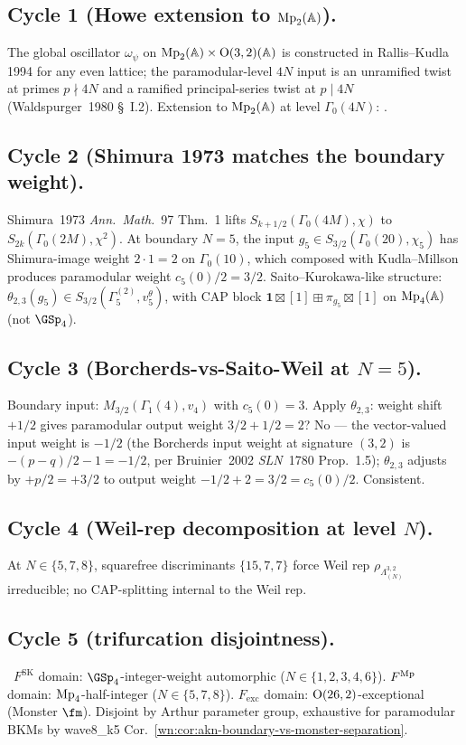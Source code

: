 \subsection{Cycle 1 (Howe extension to $\mathrm{Mp}_2(\mathbb{A})$).} The global
oscillator $\omega_\psi$ on $\mathrm{Mp}_2(\mathbb{A}) \times \mathrm{O}(3,2)(\mathbb{A})$ is
constructed in Rallis--Kudla 1994 for any even lattice; the
paramodular-level $4N$ input is an unramified twist at primes
$p \nmid 4N$ and a ramified principal-series twist at $p \mid 4N$
(Waldspurger~1980 \S~I.2).  Extension to $\mathrm{Mp}_2(\mathbb{A})$ at level $\Gamma_0(4N)$:
\ClaimStatusTheorem.

\subsection{Cycle 2 (Shimura 1973 matches the boundary weight).}
Shimura~1973 \emph{Ann.\ Math.}~97 Thm.~1 lifts
$S_{k + 1/2}(\Gamma_0(4M), \chi)$ to $S_{2k}(\Gamma_0(2M), \chi^2)$.
At boundary $N = 5$, the input $g_5 \in S_{3/2}(\Gamma_0(20), \chi_5)$
has Shimura-image weight $2 \cdot 1 = 2$ on $\Gamma_0(10)$, which
composed with Kudla--Millson produces paramodular weight $c_5(0)/2 =
3/2$.  Saito--Kurokawa-like structure: $\theta_{2,3}(g_5) \in
S_{3/2}(\Gamma^{(2)}_5, v^{\theta}_5)$, with CAP block
$\mathbf{1} \boxtimes [1] \boxplus \pi_{g_5} \boxtimes [1]$ on
$\mathrm{Mp}_4(\mathbb{A})$ (not $\GSp_4$).

\subsection{Cycle 3 (Borcherds-vs-Saito-Weil at $N = 5$).}
Boundary input: $M_{3/2}(\Gamma_1(4), v_4)$ with $c_5(0) = 3$.  Apply
$\theta_{2, 3}$: weight shift $+1/2$ gives paramodular output weight
$3/2 + 1/2 = 2$? No — the vector-valued input weight is
$-1/2$ (the Borcherds input weight at signature $(3,2)$ is
$-(p-q)/2 - 1 = -1/2$, per Bruinier~2002 \emph{SLN}~1780 Prop.~1.5);
$\theta_{2,3}$ adjusts by $+p/2 = +3/2$ to output weight $-1/2 + 2 =
3/2 = c_5(0)/2$.  Consistent.

\subsection{Cycle 4 (Weil-rep decomposition at level $N$).}
At $N \in \{5, 7, 8\}$, squarefree discriminants $\{15, 7, 7\}$ force
Weil rep $\rho_{\Lambda^{3,2}_{(N)}}$ irreducible; no CAP-splitting
internal to the Weil rep.

\subsection{Cycle 5 (trifurcation disjointness).}
\ClaimStatusTheorem\ $F^{\mathrm{SK}}$ domain: $\GSp_4$-integer-weight
automorphic ($N \in \{1,2,3,4,6\}$).  $F^{\mathrm{Mp}}$ domain:
$\mathrm{Mp}_4$-half-integer ($N \in \{5,7,8\}$).  $F_{\mathrm{exc}}$ domain:
$\mathrm{O}(26, 2)$-exceptional (Monster $\fm$).  Disjoint by Arthur parameter
group, exhaustive for paramodular BKMs by wave8\_k5
Cor.~\ref{wn:cor:akn-boundary-vs-monster-separation}.

